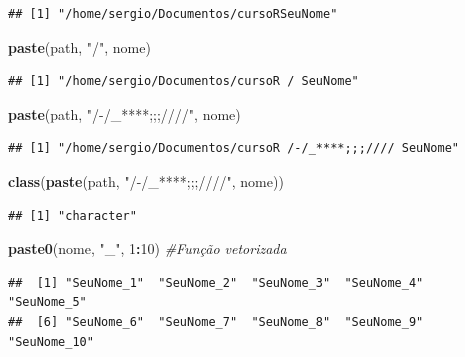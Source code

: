 \documentclass[]{book}
\newenvironment{Shaded}{\begin{snugshade}}{\end{snugshade}}
\newcommand{\KeywordTok}[1]{\textcolor[rgb]{0.13,0.29,0.53}{\textbf{#1}}}
\newcommand{\DecValTok}[1]{\textcolor[rgb]{0.00,0.00,0.81}{#1}}
\newcommand{\StringTok}[1]{\textcolor[rgb]{0.31,0.60,0.02}{#1}}
\newcommand{\CommentTok}[1]{\textcolor[rgb]{0.56,0.35,0.01}{\textit{#1}}}
\newcommand{\OperatorTok}[1]{\textcolor[rgb]{0.81,0.36,0.00}{\textbf{#1}}}
\newcommand{\NormalTok}[1]{#1}
\theoremstyle{definition}
\theoremstyle{definition}
\theoremstyle{definition}
\theoremstyle{remark}
\begin{document}
\begin{verbatim}
## [1] "/home/sergio/Documentos/cursoRSeuNome"
\end{verbatim}

\begin{Shaded}
\begin{Highlighting}[]
\KeywordTok{paste}\NormalTok{(path, }\StringTok{"/"}\NormalTok{, nome)}
\end{Highlighting}
\end{Shaded}

\begin{verbatim}
## [1] "/home/sergio/Documentos/cursoR / SeuNome"
\end{verbatim}

\begin{Shaded}
\begin{Highlighting}[]
\KeywordTok{paste}\NormalTok{(path, }\StringTok{"/-/_****;;;////"}\NormalTok{, nome)}
\end{Highlighting}
\end{Shaded}

\begin{verbatim}
## [1] "/home/sergio/Documentos/cursoR /-/_****;;;//// SeuNome"
\end{verbatim}

\begin{Shaded}
\begin{Highlighting}[]
\KeywordTok{class}\NormalTok{(}\KeywordTok{paste}\NormalTok{(path, }\StringTok{"/-/_****;;;////"}\NormalTok{, nome))}
\end{Highlighting}
\end{Shaded}

\begin{verbatim}
## [1] "character"
\end{verbatim}

\begin{Shaded}
\begin{Highlighting}[]
\KeywordTok{paste0}\NormalTok{(nome, }\StringTok{"_"}\NormalTok{, }\DecValTok{1}\OperatorTok{:}\DecValTok{10}\NormalTok{) }\CommentTok{#Função vetorizada}
\end{Highlighting}
\end{Shaded}

\begin{verbatim}
##  [1] "SeuNome_1"  "SeuNome_2"  "SeuNome_3"  "SeuNome_4"  "SeuNome_5" 
##  [6] "SeuNome_6"  "SeuNome_7"  "SeuNome_8"  "SeuNome_9"  "SeuNome_10"
\end{verbatim}
\end{document}
